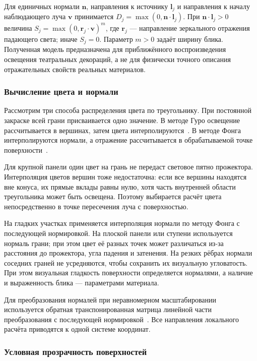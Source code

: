 Для единичных нормали $\mathbf n$, направления к источнику $\mathbf l_j$ и направления к началу наблюдающего луча $\mathbf v$ принимается $D_j=\max(0,\mathbf n\cdot\mathbf l_j)$. При $\mathbf n\cdot\mathbf l_j>0$ величина $S_j=\max(0,\mathbf r_j\cdot\mathbf v)^m$, где $\mathbf r_j$ --- направление зеркального отражения падающего света; иначе $S_j=0$. Параметр $m>0$ задаёт ширину блика. Полученная модель предназначена для приближённого воспроизведения освещения театральных декораций, а не для физически точного описания отражательных свойств реальных материалов.

\subsubsection{Вычисление цвета и нормали}

Рассмотрим три способа распределения цвета по треугольнику. При постоянной закраске всей грани присваивается одно значение. В методе Гуро освещение рассчитывается в вершинах, затем цвета интерполируются~\cite[разд.~<<Shading Algorithms>>]{shading-notes}. В методе Фонга интерполируются нормали, а отражение рассчитывается в обрабатываемой точке поверхности~\cite[слайд~71]{phong-model-notes}.

Для крупной панели один цвет на грань не передаст световое пятно прожектора. Интерполяция цветов вершин тоже недостаточна: если все вершины находятся вне конуса, их прямые вклады равны нулю, хотя часть внутренней области треугольника может быть освещена. Поэтому выбирается расчёт цвета непосредственно в точке пересечения луча с поверхностью.

На гладких участках применяется интерполяция нормали по методу Фонга с последующей нормировкой. На плоской панели или ступени используется нормаль грани; при этом цвет её разных точек может различаться из-за расстояния до прожектора, угла падения и затенения. На резких рёбрах нормали соседних граней не усредняются, чтобы сохранить их визуальную угловатость. При этом визуальная гладкость поверхности определяется нормалями, а наличие и выраженность блика — параметрами материала.

Для преобразования нормалей при неравномерном масштабировании используется обратная транспонированная матрица линейной части преобразования с последующей нормировкой~\cite[разд.~3.10.3]{pbrt4}. Все направления локального расчёта приводятся к одной системе координат.

\subsubsection{Условная прозрачность поверхностей}
\label{subsubsec:simple-transparency}

